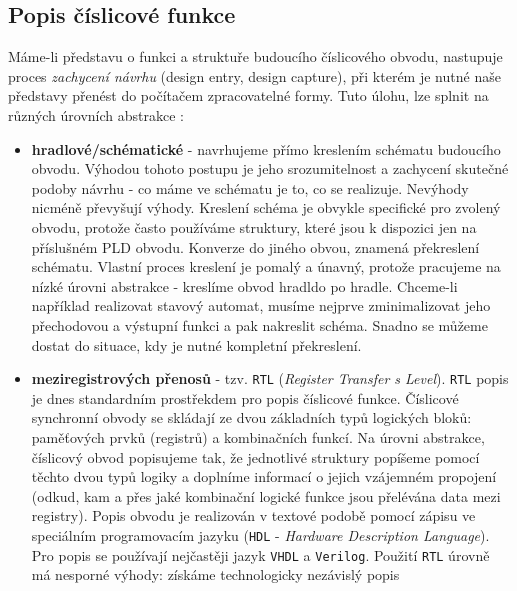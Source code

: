     \subsection{Popis číslicové funkce}
      Máme-li představu o funkci a struktuře budoucího číslicového obvodu, nastupuje proces 
      \emph{zachycení návrhu} (design entry, design capture), při kterém je nutné naše představy 
      přenést do počítačem zpracovatelné formy. Tuto úlohu, lze splnit na různých úrovních 
      abstrakce \cite[s.~19]{Stastny2010}:
      \begin{itemize}
        \item \textbf{hradlové/schématické} - navrhujeme přímo kreslením schématu budoucího 
              obvodu. Výhodou tohoto postupu je jeho srozumitelnost a zachycení skuteč\-né podoby 
              návrhu  - co máme ve schématu je to, co se realizuje. Nevýhody nicméně převyšují 
              výhody. Kreslení schéma je obvykle specifické pro zvolený obvodu, protože často 
              používáme struktury, které jsou k dispozici jen na příslušném PLD obvodu. Konverze do 
              jiného obvou, znamená překreslení schématu. Vlastní proces kreslení je pomalý a 
              únavný, protože pracujeme na nízké úrovni abstrakce - kreslíme obvod hradldo po 
              hradle. Chceme-li například realizovat stavový automat, musíme nejprve zminimalizovat 
              jeho přechodovou a výstupní funkci a pak nakreslit schéma. Snadno se můžeme dostat do 
              situace, kdy je nutné kompletní překreslení. 
        \item \textbf{meziregistrových přenosů} - tzv. \texttt{RTL} (\emph{Register Transfer  s  
              Level}). \texttt{RTL} popis je dnes standardním prostřekdem pro popis číslicové 
              funkce. Číslicové synchronní obvody se skládají ze dvou základních typů         
              logických bloků: pamě\-ťo\-vých prvků (registrů) a kombinačních funkcí. Na úrovni 
              abstrakce, číslicový obvod popisujeme tak, že jednotlivé struktury popíšeme pomocí 
              těchto dvou typů logiky a doplníme informací o jejich vzájemném propojení          
              (odkud, kam a přes jaké kombinační logické funkce jsou přelévána data mezi registry). 
              Popis obvodu je realizován v textové podobě pomocí zápisu ve speciálním 
              progra\-mo\-va\-cím jazyku (\texttt{HDL} - \emph{Hardware Description         
              Language}). Pro popis se používají nejčastěji jazyk \texttt{VHDL} a \texttt{Verilog}. 
              Použití \texttt{RTL} úrovně má nesporné výhody: získáme technologicky nezávislý popis 

\end{itemize}
